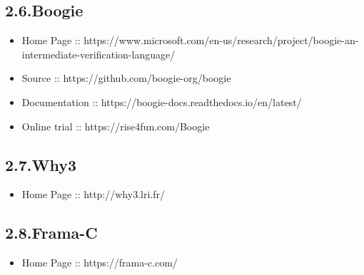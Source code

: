 \documentclass[12pt,twoside]{article}
\begin{document}
\subsection{2.6.\hspace*{0.5em}Boogie}\label{sec-boogie}%

\begin{itemize}[noitemsep,topsep=\mdcompacttopsep]%

\item{}Home Page :: https://www.microsoft.com/en-us/research/project/boogie-an-intermediate-verification-language/%

\item{}Source :: https://github.com/boogie-org/boogie%

\item{}Documentation :: https://boogie-docs.readthedocs.io/en/latest/%

\item{}Online trial :: https://rise4fun.com/Boogie%
\end{itemize}%

\subsection{2.7.\hspace*{0.5em}Why3}\label{sec-why3}%

\begin{itemize}[noitemsep,topsep=\mdcompacttopsep]%

\item{}Home Page :: http://why3.lri.fr/%
\end{itemize}%

\subsection{2.8.\hspace*{0.5em}Frama-C}\label{sec-frama-c}%

\begin{itemize}[noitemsep,topsep=\mdcompacttopsep]%

\item{}Home Page :: https://frama-c.com/%
\end{itemize}%
\end{document}
